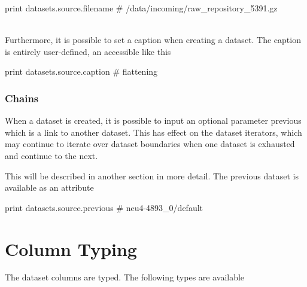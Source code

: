 \begin{python}
print datasets.source.filename
# /data/incoming/raw_repository_5391.gz
\end{python}
\\
Furthermore, it is possible to set a caption when creating a dataset.
The caption is entirely user-defined, an accessible like this

\begin{python}
print datasets.source.caption
# flattening
\end{python}



\subsubsection{Chains}

When a dataset is created, it is possible to input an optional
parameter previous which is a link to another dataset.  This has
effect on the dataset iterators, which may continue to iterate over
dataset boundaries when one dataset is exhausted and continue to the
next.

This will be described in another section in more detail.  The
previous dataset is available as an attribute

\begin{python}
print datasets.source.previous
# neu4-4893_0/default
\end{python}



\newpage
\section{Column Typing}
The dataset columns are typed.  The following types are available

